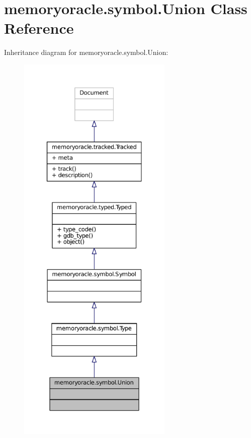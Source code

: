 \hypertarget{classmemoryoracle_1_1symbol_1_1Union}{}\section{memoryoracle.\+symbol.\+Union Class Reference}
\label{classmemoryoracle_1_1symbol_1_1Union}


Inheritance diagram for memoryoracle.\+symbol.\+Union\+:
\nopagebreak
\begin{figure}[H]
\begin{center}
\leavevmode
\includegraphics[height=550pt]{classmemoryoracle_1_1symbol_1_1Union__inherit__graph}
\end{center}
\end{figure}


